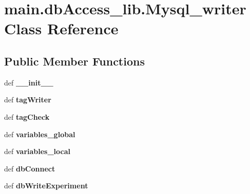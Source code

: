 \hypertarget{classmain_1_1db_access__lib_1_1_mysql__writer}{\section{main.\-db\-Access\-\_\-lib.\-Mysql\-\_\-writer Class Reference}
\label{classmain_1_1db_access__lib_1_1_mysql__writer}
}
\subsection*{Public Member Functions}
\begin{DoxyCompactItemize}
\item 
\hypertarget{classmain_1_1db_access__lib_1_1_mysql__writer_ac7ef0b7c42e9015bcbde4d1850bba2bf}{def {\bfseries \-\_\-\-\_\-init\-\_\-\-\_\-}}\label{classmain_1_1db_access__lib_1_1_mysql__writer_ac7ef0b7c42e9015bcbde4d1850bba2bf}

\item 
\hypertarget{classmain_1_1db_access__lib_1_1_mysql__writer_a6b006b96deff3431abe2659bdb2ac439}{def {\bfseries tag\-Writer}}\label{classmain_1_1db_access__lib_1_1_mysql__writer_a6b006b96deff3431abe2659bdb2ac439}

\item 
\hypertarget{classmain_1_1db_access__lib_1_1_mysql__writer_a7c61f6a4987eca3fc114750658273a9f}{def {\bfseries tag\-Check}}\label{classmain_1_1db_access__lib_1_1_mysql__writer_a7c61f6a4987eca3fc114750658273a9f}

\item 
\hypertarget{classmain_1_1db_access__lib_1_1_mysql__writer_a326a5ac025c850077cf7a50f1c0d87e8}{def {\bfseries variables\-\_\-global}}\label{classmain_1_1db_access__lib_1_1_mysql__writer_a326a5ac025c850077cf7a50f1c0d87e8}

\item 
\hypertarget{classmain_1_1db_access__lib_1_1_mysql__writer_af6c4d1ee9f32b1a8332770a9f0410669}{def {\bfseries variables\-\_\-local}}\label{classmain_1_1db_access__lib_1_1_mysql__writer_af6c4d1ee9f32b1a8332770a9f0410669}

\item 
\hypertarget{classmain_1_1db_access__lib_1_1_mysql__writer_ade5de279756f6f660fe54db385e2fe27}{def {\bfseries db\-Connect}}\label{classmain_1_1db_access__lib_1_1_mysql__writer_ade5de279756f6f660fe54db385e2fe27}

\item 
\hypertarget{classmain_1_1db_access__lib_1_1_mysql__writer_aac403a3701e71603a845b7dece7a069f}{def {\bfseries db\-Write\-Experiment}}\label{classmain_1_1db_access__lib_1_1_mysql__writer_aac403a3701e71603a845b7dece7a069f}


\end{DoxyCompactItemize}
